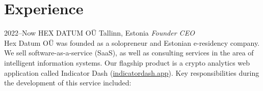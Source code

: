 \documentclass{friggeri-cv}
\begin{document}

\section{Experience}

\begin{entrylist}
\entry
{2022--Now}
{HEX DATUM OÜ}
{Tallinn, Estonia}
{\emph{Founder CEO}\\
Hex Datum OÜ was founded as a solopreneur and Estonian e-residency company. We sell software-as-a-service (SaaS), as well as consulting services in the area of intelligent information systems. Our flagship product is a crypto analytics web application called Indicator Dash (\href{https://indicatordash.app}{indicatordash.app}). Key responsibilities during the development of this service included:}
\end{entrylist}
\end{document}
